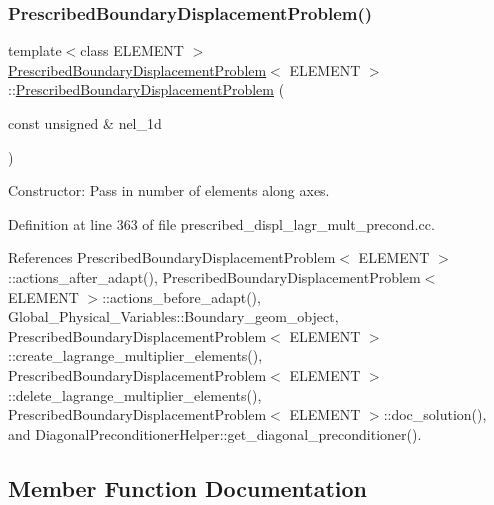\subsubsection{\texorpdfstring{Prescribed\+Boundary\+Displacement\+Problem()}{PrescribedBoundaryDisplacementProblem()}\hspace{0.1cm}{\footnotesize\ttfamily [3/3]}}
{\footnotesize\ttfamily template$<$class E\+L\+E\+M\+E\+NT $>$ \\
\hyperlink{classPrescribedBoundaryDisplacementProblem}{Prescribed\+Boundary\+Displacement\+Problem}$<$ E\+L\+E\+M\+E\+NT $>$\+::\hyperlink{classPrescribedBoundaryDisplacementProblem}{Prescribed\+Boundary\+Displacement\+Problem} (\begin{DoxyParamCaption}\item[{const unsigned \&}]{nel\+\_\+1d }\end{DoxyParamCaption})}



Constructor\+: Pass in number of elements along axes. 



Definition at line 363 of file prescribed\+\_\+displ\+\_\+lagr\+\_\+mult\+\_\+precond.\+cc.



References Prescribed\+Boundary\+Displacement\+Problem$<$ E\+L\+E\+M\+E\+N\+T $>$\+::actions\+\_\+after\+\_\+adapt(), Prescribed\+Boundary\+Displacement\+Problem$<$ E\+L\+E\+M\+E\+N\+T $>$\+::actions\+\_\+before\+\_\+adapt(), Global\+\_\+\+Physical\+\_\+\+Variables\+::\+Boundary\+\_\+geom\+\_\+object, Prescribed\+Boundary\+Displacement\+Problem$<$ E\+L\+E\+M\+E\+N\+T $>$\+::create\+\_\+lagrange\+\_\+multiplier\+\_\+elements(), Prescribed\+Boundary\+Displacement\+Problem$<$ E\+L\+E\+M\+E\+N\+T $>$\+::delete\+\_\+lagrange\+\_\+multiplier\+\_\+elements(), Prescribed\+Boundary\+Displacement\+Problem$<$ E\+L\+E\+M\+E\+N\+T $>$\+::doc\+\_\+solution(), and Diagonal\+Preconditioner\+Helper\+::get\+\_\+diagonal\+\_\+preconditioner().



\subsection{Member Function Documentation}
\mbox{\label{classPrescribedBoundaryDisplacementProblem_aae7225db18ad5c8429c0eb96fa37b585}} 
